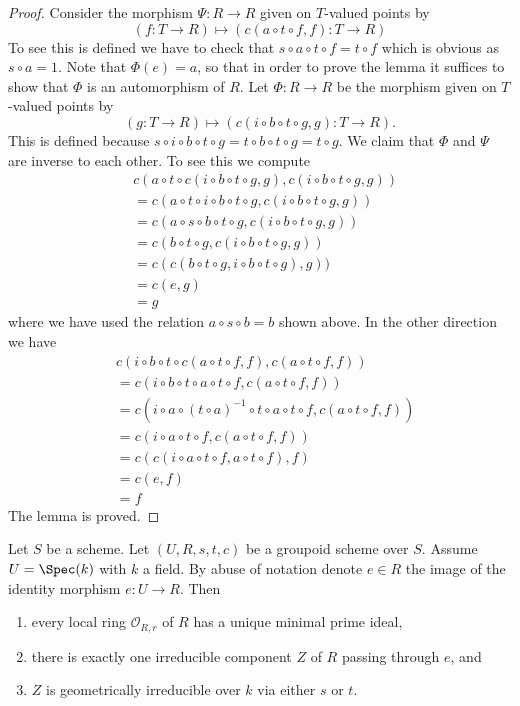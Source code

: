 \begin{proof}
\medskip\noindent
Consider the morphism $\Psi : R \to R$ given on $T$-valued points
by
$$
(f : T \to R) \longmapsto (c(a \circ t \circ f, f) : T \to R)
$$
To see this is defined we have to check that
$s \circ a \circ t \circ f = t \circ f$ which is obvious as $s \circ a = 1$.
Note that $\Phi(e) = a$, so that in order to prove the lemma it
suffices to show that $\Phi$ is an automorphism of $R$.
Let $\Phi : R \to R$ be the morphism given on $T$-valued points by
$$
(g : T \to R) \longmapsto (c(i \circ b \circ t \circ g, g) : T \to R).
$$
This is defined because
$s \circ i \circ b \circ t \circ g = t \circ b \circ t \circ g =
t \circ g$. We claim that $\Phi$ and $\Psi$ are inverse to
each other. To see this we compute
\begin{align*}
& c(a \circ t \circ c(i \circ b \circ t \circ g, g),
c(i \circ b \circ t \circ g, g)) \\
& =
c(a \circ t \circ i \circ b \circ t \circ g,
c(i \circ b \circ t \circ g, g)) \\
& =
c(a \circ s \circ b \circ t \circ g,
c(i \circ b \circ t \circ g, g)) \\
& =
c(b \circ t \circ g, c(i \circ b \circ t \circ g, g)) \\
& =
c(c(b \circ t \circ g, i \circ b \circ t \circ g), g)) \\
& =
c(e, g) \\
& = g
\end{align*}
where we have used the relation $a \circ s \circ b = b$ shown above.
In the other direction we have
\begin{align*}
& c(i \circ b \circ t \circ c(a \circ t \circ f, f), c(a \circ t \circ f, f)) \\
& =
c(i \circ b \circ t \circ a \circ t \circ f, c(a \circ t \circ f, f)) \\
& =
c(i \circ a \circ (t \circ a)^{-1} \circ t \circ a \circ t \circ f,
c(a \circ t \circ f, f)) \\
& =
c(i \circ a \circ t \circ f, c(a \circ t \circ f, f)) \\
& =
c(c(i \circ a \circ t \circ f, a \circ t \circ f), f) \\
& =
c(e, f) \\
& = f
\end{align*}
The lemma is proved.
\end{proof}

\begin{lemma}
\label{lemma-groupoid-on-field-geometrically-irreducible}
Let $S$ be a scheme. Let $(U, R, s, t, c)$ be a groupoid scheme
over $S$. Assume $U = \Spec(k)$ with $k$ a field.
By abuse of notation denote $e \in R$ the image of the identity
morphism $e : U \to R$. Then
\begin{enumerate}
\item every local ring $\mathcal{O}_{R, r}$ of $R$ has a unique
minimal prime ideal,
\item there is exactly one irreducible component $Z$ of $R$
passing through $e$, and
\item $Z$ is geometrically irreducible over $k$ via either
$s$ or $t$.
\end{enumerate}
\end{lemma}

